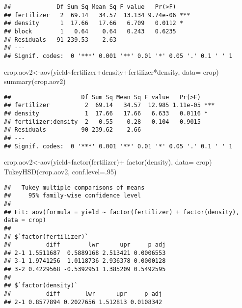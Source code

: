 \documentclass[
]{article}
\newenvironment{Shaded}{\begin{snugshade}}{\end{snugshade}}
\newcommand{\AttributeTok}[1]{\textcolor[rgb]{0.77,0.63,0.00}{#1}}
\newcommand{\DecValTok}[1]{\textcolor[rgb]{0.00,0.00,0.81}{#1}}
\newcommand{\FunctionTok}[1]{\textcolor[rgb]{0.00,0.00,0.00}{#1}}
\newcommand{\NormalTok}[1]{#1}
\newcommand{\OtherTok}[1]{\textcolor[rgb]{0.56,0.35,0.01}{#1}}
\newcommand{\SpecialCharTok}[1]{\textcolor[rgb]{0.00,0.00,0.00}{#1}}
\begin{document}
\begin{verbatim}
##             Df Sum Sq Mean Sq F value   Pr(>F)    
## fertilizer   2  69.14   34.57  13.134 9.74e-06 ***
## density      1  17.66   17.66   6.709   0.0112 *  
## block        1   0.64    0.64   0.243   0.6235    
## Residuals   91 239.53    2.63                     
## ---
## Signif. codes:  0 '***' 0.001 '**' 0.01 '*' 0.05 '.' 0.1 ' ' 1
\end{verbatim}

\begin{Shaded}
\begin{Highlighting}[]
\NormalTok{crop.aov2}\OtherTok{\textless{}{-}}\FunctionTok{aov}\NormalTok{(yield}\SpecialCharTok{\textasciitilde{}}\NormalTok{fertilizer}\SpecialCharTok{+}\NormalTok{density}\SpecialCharTok{+}\NormalTok{fertilizer}\SpecialCharTok{*}\NormalTok{density, }\AttributeTok{data=}\NormalTok{ crop)}
\FunctionTok{summary}\NormalTok{(crop.aov2)}
\end{Highlighting}
\end{Shaded}

\begin{verbatim}
##                    Df Sum Sq Mean Sq F value   Pr(>F)    
## fertilizer          2  69.14   34.57  12.985 1.11e-05 ***
## density             1  17.66   17.66   6.633   0.0116 *  
## fertilizer:density  2   0.55    0.28   0.104   0.9015    
## Residuals          90 239.62    2.66                     
## ---
## Signif. codes:  0 '***' 0.001 '**' 0.01 '*' 0.05 '.' 0.1 ' ' 1
\end{verbatim}

\begin{Shaded}
\begin{Highlighting}[]
\NormalTok{crop.aov2}\OtherTok{\textless{}{-}}\FunctionTok{aov}\NormalTok{(yield}\SpecialCharTok{\textasciitilde{}}\FunctionTok{factor}\NormalTok{(fertilizer)}\SpecialCharTok{+} \FunctionTok{factor}\NormalTok{(density), }\AttributeTok{data=}\NormalTok{ crop)}
\FunctionTok{TukeyHSD}\NormalTok{(crop.aov2, }\AttributeTok{conf.level=}\NormalTok{.}\DecValTok{95}\NormalTok{)}
\end{Highlighting}
\end{Shaded}

\begin{verbatim}
##   Tukey multiple comparisons of means
##     95% family-wise confidence level
## 
## Fit: aov(formula = yield ~ factor(fertilizer) + factor(density), data = crop)
## 
## $`factor(fertilizer)`
##          diff        lwr      upr     p adj
## 2-1 1.5511687  0.5889168 2.513421 0.0006553
## 3-1 1.9741256  1.0118736 2.936378 0.0000128
## 3-2 0.4229568 -0.5392951 1.385209 0.5492595
## 
## $`factor(density)`
##          diff       lwr      upr     p adj
## 2-1 0.8577894 0.2027656 1.512813 0.0108342
\end{verbatim}
\end{document}
